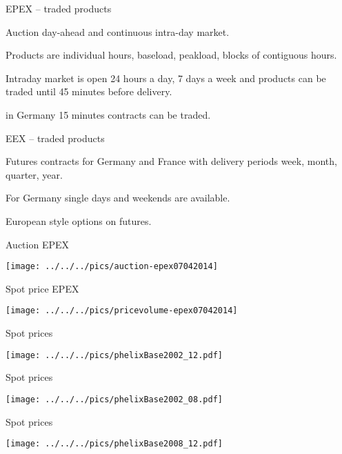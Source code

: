{EPEX -- traded products}
\item<1-> Auction day-ahead and continuous intra-day market.
\item<2-> Products are individual hours, baseload, peakload, blocks of contiguous hours.
\item<3-> Intraday market is open 24 hours a day, 7 days a week and products can be traded until 45 minutes before delivery.
\item<4-> in Germany 15 minutes contracts can be traded.

{EEX -- traded products}
\item<1-> Futures contracts for Germany and France with delivery periods week, month, quarter, year.
\item<2-> For Germany single days and weekends are available.
\item<3-> European style options on futures.

{Auction EPEX}
\begin{center}
\texttt{[image: ../../../pics/auction-epex07042014]}
\end{center}

{Spot price EPEX}
\begin{center}
\texttt{[image: ../../../pics/pricevolume-epex07042014]}
\end{center}

{Spot prices}
\begin{center}
\texttt{[image: ../../../pics/phelixBase2002\_12.pdf]}
\end{center}

{Spot prices}
\begin{center}
\texttt{[image: ../../../pics/phelixBase2002\_08.pdf]}
\end{center}

{Spot prices}
\begin{center}
\texttt{[image: ../../../pics/phelixBase2008\_12.pdf]}
\end{center}

